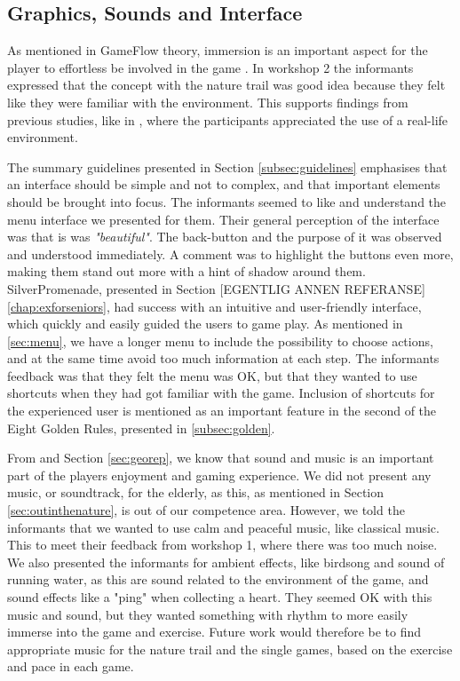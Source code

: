 \subsection{Graphics, Sounds and Interface}

As mentioned in GameFlow theory, immersion is an important aspect for the player to effortless be involved in the game \cite{sweetser}. In workshop 2 the informants expressed that the concept with the nature trail was good idea because they felt like they were familiar with the environment. This supports findings from previous studies, like in \cite{gerling2}, where the participants appreciated the use of a real-life environment.  

The summary guidelines presented in Section \ref{subsec:guidelines} emphasises that an interface should be simple and not to complex, and that important elements should be brought into focus. The informants seemed to like and understand the menu interface we presented for them. Their general perception of the interface was that is was \emph{"beautiful"}. The back-button and the purpose of it was observed and understood immediately. A comment was to highlight the buttons even more, making them stand out more with a hint of shadow around them. SilverPromenade, presented in Section [EGENTLIG ANNEN REFERANSE] \ref{chap:exforseniors}, had success with an intuitive and user-friendly interface, which quickly and easily guided the users to game play. As mentioned in \ref{sec:menu}, we have a longer menu to include the possibility to choose actions, and at the same time avoid too much information at each step. The informants feedback was that they felt the menu was OK, but that they wanted to use shortcuts when they had got familiar with the game. Inclusion of shortcuts for the experienced user is mentioned as an important feature in the second of the Eight Golden Rules, presented in \ref{subsec:golden}.

From \cite{schutzer} and Section \ref{sec:georep}, we know that sound and music is an important part of the players enjoyment and gaming experience. We did not present any music, or soundtrack, for the elderly, as this, as mentioned in Section \ref{sec:outinthenature}, is out of our competence area. However, we told the informants that we wanted to use calm and peaceful music, like classical music. This to meet their feedback from workshop 1, where there was too much noise. We also presented the informants for ambient effects, like birdsong and sound of running water, as this are sound related to the environment of the game, and sound effects like a "ping" when collecting a heart. They seemed OK with this music and sound, but they wanted something with rhythm to more easily immerse into the game and exercise. Future work would therefore be to find appropriate music for the nature trail and the single games, based on the exercise and pace in each game. 

